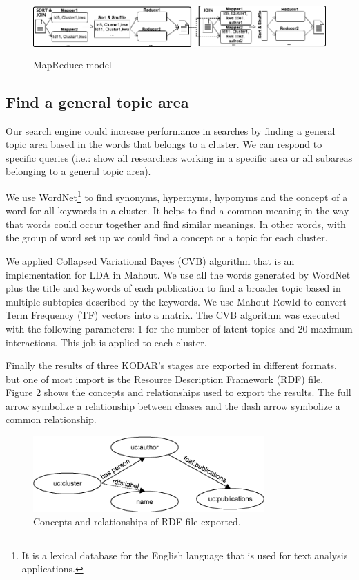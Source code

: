 \documentclass[11pt]{article}
\begin{document}
\begin{figure}[ht!]
	\centering
		\includegraphics[height=2.2cm]{findka.png}
	\caption{MapReduce model}
	\label{fig:mapreducemodel}
\end{figure}

\subsection{Find a general topic area}

Our search engine could increase performance in searches by finding a general topic area based in the words that belongs to a cluster. We can respond to specific queries (i.e.: show all researchers working in a specific area or all subareas belonging to a general topic area).

We use WordNet\footnote{It is a lexical database for the English language that is used for text analysis applications.} \cite{Miller} to find synonyms, hypernyms, hyponyms and the concept of a word for all keywords in a cluster. It helps to find a common meaning in the way that words could occur together and find similar meanings. In other words, with the group of word set up we could find a concept or a topic for each cluster.

We applied Collapsed Variational Bayes (CVB) algorithm \cite{Blei} that is an implementation for LDA in Mahout. We use all the words generated by WordNet plus the title and keywords of each publication to find a broader topic based in multiple subtopics described by the keywords. We use Mahout RowId to convert Term Frequency (TF) vectors into a matrix. The CVB algorithm was executed with the following parameters: 1 for the number of latent topics and 20 maximum interactions. This job is applied to each cluster.

Finally the results of three KODAR's stages are exported in different formats, but one of most import is the Resource Description Framework (RDF) file. Figure \ref{fig:descriptionrdf} shows the concepts and relationships used to export the results. The full arrow symbolize a relationship between classes and the dash arrow symbolize a common relationship.

\begin{figure}[ht!]
	\centering
		\includegraphics[height=2.9cm]{anotacion.png}
	\caption{Concepts and relationships of RDF file exported.}
	\label{fig:descriptionrdf}
\end{figure}
\end{document}
